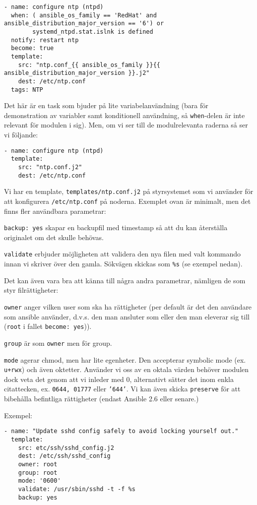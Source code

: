 \begin{verbatim}
- name: configure ntp (ntpd)
  when: ( ansible_os_family == 'RedHat' and ansible_distribution_major_version == '6') or
        systemd_ntpd.stat.islnk is defined
  notify: restart ntp
  become: true
  template:
    src: "ntp.conf_{{ ansible_os_family }}{{ ansible_distribution_major_version }}.j2"
    dest: /etc/ntp.conf
  tags: NTP
\end{verbatim}

Det här är en task som bjuder på lite variabelanvändning (bara för demonstration av variabler samt konditionell 
användning, så \texttt{when}-delen är inte relevant för modulen i sig). Men, om vi ser till de modulrelevanta 
raderna så ser vi följande:

\begin{verbatim}
- name: configure ntp (ntpd)
  template:
    src: "ntp.conf.j2"
    dest: /etc/ntp.conf
\end{verbatim}

Vi har en template, \texttt{templates/ntp.conf.j2} på styrsystemet som vi använder för att konfigurera \texttt{/etc/ntp.conf} på noderna. Exemplet ovan är minimalt, men det finns fler användbara parametrar:

\texttt{backup: yes} skapar en backupfil med timestamp så att du kan återställa originalet om det skulle behövas.

\texttt{validate} erbjuder möjligheten att validera den nya filen med valt kommando innan vi skriver över den gamla.
Sökvägen skickas som \verb+%s+ (se exempel nedan).

Det kan även vara bra att känna till några andra parametrar, nämligen de som styr filrättigheter:

\texttt{owner} anger vilken user som ska ha rättigheter (per default är det den användare som ansible använder, d.v.s. den man ansluter som eller den man eleverar sig till (\texttt{root} i fallet \texttt{become: yes})).

\texttt{group} är som \texttt{owner} men för group.

\texttt{mode} agerar chmod, men har lite egenheter. Den accepterar symbolic mode (ex. \texttt{u+rwx}) och även
oktetter. Använder vi oss av en oktala värden behöver modulen dock veta det genom att vi inleder med 0, alternativt
sätter det inom enkla citattecken, ex. \texttt{0644, 01777} eller \texttt{'644'}. Vi kan även skicka \texttt{preserve} för att bibehålla befintliga rättigheter (endast Ansible 2.6 eller senare.)

Exempel:
\begin{verbatim}
- name: "Update sshd config safely to avoid locking yourself out."
  template:
    src: etc/ssh/sshd_config.j2
    dest: /etc/ssh/sshd_config
    owner: root
    group: root
    mode: '0600'
    validate: /usr/sbin/sshd -t -f %s
    backup: yes
\end{verbatim}

